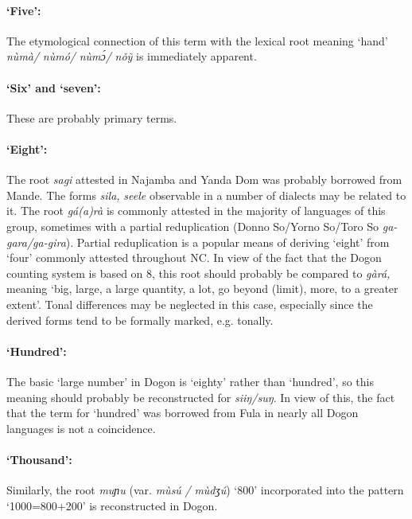 \paragraph*{‘Five’:} The etymological connection of this term with the lexical root meaning ‘hand’ \textit{nùmà/} \textit{nùmó/} \textit{nùm{\'{ɔ}}/} \textit{n{\v{o}}{\~{y}}} is immediately apparent.

\paragraph*{‘Six’ and ‘seven’:} These are probably primary terms. 

\paragraph*{‘Eight’:} The root \textit{sagi} attested in Najamba and Yanda Dom was probably borrowed from Mande. The forms \textit{sila,} \textit{seele} observable in a number of dialects may be related to it. The root  \textit{gá(a)rà} is commonly attested in the majority of languages of this group, sometimes with a partial reduplication (Donno So/Yorno So/Toro So \textit{ga-gara/ga-gira}). Partial reduplication is a popular means of deriving ‘eight’ from ‘four’ commonly attested throughout NC. In view of the fact that the Dogon counting system is based on 8, this root should probably be compared to \textit{gàrá,} meaning ‘big, large, a large quantity, a lot, go beyond (limit), more, to a greater extent’. Tonal differences may be neglected in this case, especially since the derived forms tend to be formally marked, e.g. tonally.

\paragraph*{‘Hundred’:} The basic ‘large number’ in Dogon is ‘eighty’ rather than ‘hundred’, so this meaning should probably be reconstructed for \textit{siiŋ/suŋ}. In view of this, the fact that the term for ‘hundred’ was borrowed from Fula in nearly all Dogon languages is not a coincidence.

\paragraph*{‘Thousand’:} Similarly, the root \textit{muɲu} (var. \textit{mùsú} \textit{/} \textit{mùdʒú}) ‘800’ incorporated into the pattern ‘1000=800+200’ is reconstructed in Dogon. 

